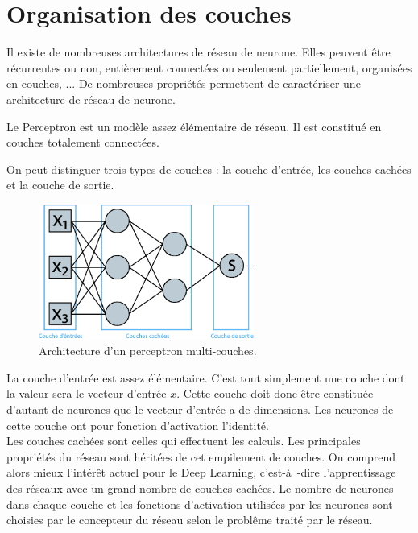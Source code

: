 \documentclass[a4paper,twoside]{report}
\begin{document}
            \section{Organisation des couches}

                Il existe de nombreuses architectures de réseau de neurone. Elles peuvent être récurrentes ou non, entièrement connectées ou seulement partiellement, organisées en couches, ... De nombreuses propriétés permettent de caractériser une architecture de réseau de neurone.

                Le Perceptron est un modèle assez élémentaire de réseau. Il est constitué en couches totalement connectées.

                On peut distinguer trois types de couches : la couche d'entrée, les couches cachées et la couche de sortie.\\

                \begin{figure}
                    \begin{center}
                        \includegraphics[width=200pt]{Images/perceptron-01.png}
                    \end{center}
                    \caption{Architecture d'un perceptron multi-couches.}
                \end{figure}

                La couche d'entrée est assez élémentaire. C'est tout simplement une couche dont la valeur sera le vecteur d'entrée $x$. Cette couche doit donc être constituée d'autant de neurones que le vecteur d'entrée a de dimensions. Les neurones de cette couche ont pour fonction d'activation l'identité.\\

                Les couches cachées sont celles qui effectuent les calculs. Les principales propriétés du réseau sont héritées de cet empilement de couches. On comprend alors mieux l'intérêt actuel pour le Deep Learning, c'est-à -dire l'apprentissage des réseaux avec un grand nombre de couches cachées.
                Le nombre de neurones dans chaque couche et les fonctions d'activation utilisées par les neurones sont choisies par le concepteur du réseau selon le problême traité par le réseau.\\
\end{document}
